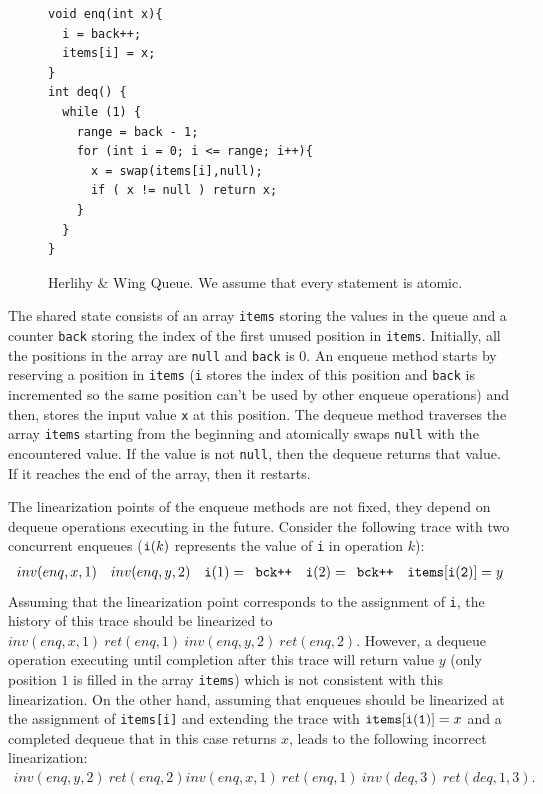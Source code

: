 \begin{figure}
\vspace{-8mm}
\begin{lstlisting}
void enq(int x){
  i = back++;
  items[i] = x;
}
int deq() {
  while (1) {
    range = back - 1;
    for (int i = 0; i <= range; i++){
      x = swap(items[i],null);
      if ( x != null ) return x;
    }
  }
}
  \end{lstlisting}
\vspace{-5mm}
\caption{Herlihy \& Wing Queue. We assume that every statement is atomic.}
\label{fig:HerlihyWing}
\vspace{-6mm}
\end{figure}
The shared state consists of an array {\tt items} storing the values in the queue and a counter {\tt back} storing the index of the first unused position in {\tt items}. Initially, all the positions in the array are {\tt null} and {\tt back} is 0.
An enqueue method starts by reserving a position in {\tt items} ({\tt i} stores the index of this position and {\tt back} is incremented so the same position can't be used by other enqueue operations) and then, stores the input value {\tt x} at this position. The dequeue method traverses the array {\tt items} starting from the beginning and atomically swaps {\tt null} with the encountered value. If the value is not {\tt null}, then the dequeue returns that value. If it reaches the end of the array, then it restarts.

The linearization points of the enqueue methods are not fixed, they depend on dequeue operations executing in the future. Consider the following trace with two concurrent enqueues (${\tt i}(k)$ represents the value of {\tt i} in operation $k$):
\begin{align*}
inv(enq,x,1)\ \ \ inv(enq,y,2)\ \ \ {\tt i}(1) = \mbox{{\tt bck++}}\ \ \ {\tt i}(2) = \mbox{{\tt bck++}}\ \ \ {\tt items[i(2)]} = y
\end{align*}
Assuming that the linearization point corresponds to the assignment of {\tt i}, the history of this trace should be linearized to $inv(enq,x,1)\ ret(enq,1)\ inv(enq,y,2)\ ret(enq,2)$. However, a dequeue operation executing until completion after this trace will return value $y$ (only position $1$ is filled in the array {\tt items}) which is not consistent with this linearization. On the other hand, assuming that enqueues should be linearized at the assignment of {\tt items[i]} and extending the trace with ${\tt items[i(1)]} = x$ and a completed dequeue that in this case returns $x$, leads to the following incorrect linearization:
\begin{align*}
inv(enq,y,2)\ ret(enq,2) inv(enq,x,1)\ ret(enq,1)\ inv(deq,3)\ ret(deq,1,3).
\end{align*}

